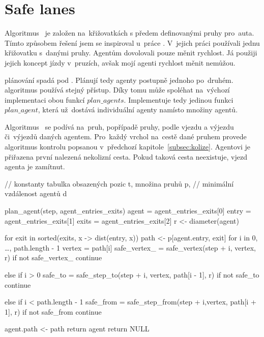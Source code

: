 \section{Safe lanes}\label{sec:safe_lanes}



Algoritmus~ je založen na~křižovatkách s předem definovanými pruhy pro~auta.
Tímto způsobem řešení jsem se inspiroval u~práce \citet{Dresner}.
V~jejich práci používali jednu křižovatku s~danými pruhy.
Agentům dovolovali pouze měnit rychlost.
Já použiji jejich koncept jízdy v~pruzích, avšak mojí agenti rychlost měnit nemůžou.

\citet{Dresner} plánování spadá pod .
Plánují tedy agenty postupně jednoho po~druhém.
 algoritmus používá stejný přístup.
Díky tomu může spoléhat na~výchozí implementaci obou funkcí $plan\_agents$.
Implementuje tedy jedinou funkci $plan\_agent$, která už~dostává individuální agenty namísto množiny agentů.

Algoritmus~ se podívá na~pruh, popřípadě pruhy, podle vjezdu a výjezdu či~výjezdů daných agentem.
Pro~každý vrchol na~cestě dané pruhem provede algoritmus kontrolu popsanou v~předchozí kapitole~\ref{subsec:kolize}.
Agentovi je přiřazena první nalezená nekolizní cesta.
Pokud taková cesta neexistuje, vjezd agenta je zamítnut.

\begin{code}
// konstanty tabulka obsazených pozic t, množina pruhů p,
// minimální vzdálenost agentů d

plan_agent(step, agent_entries_exits)
  agent = agent_entries_exits[0]
  entry = agent_entries_exits[1]
  exits = agent_entries_exits[2]
  r <- diameter(agent)

  for exit in sorted(exits, x -> dist(entry, x))
    path <- p[agent.entry, exit]
    for i in 0, \ldots, path.length - 1
      vertex = path[i]
      safe_vertex_ = safe_vertex(step + i, vertex, r)
      if not safe_vertex_
        continue

      else if i > 0
        safe_to = safe_step_to(step + i, vertex, path[i - 1], r)
        if not safe_to
          continue

      else if i < path.length - 1
        safe_from = safe_step_from(step + i,vertex, path[i + 1], r)
        if not safe_from
          continue

    agent.path <- path
    return agent
  return NULL
\end{code}
